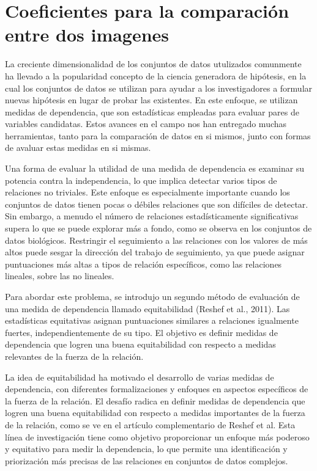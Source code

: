 \chapter{Coeficientes para la
comparaci\'on entre dos
imagenes}\label{chap3}

La creciente dimensionalidad de los conjuntos de datos utulizados comunmente ha llevado a la popularidad concepto de la ciencia generadora de hip\'otesis, en la cual los conjuntos de datos se utilizan para ayudar a los investigadores a formular nuevas hip\'otesis en lugar de probar las existentes. En este enfoque, se utilizan medidas de dependencia, que son estad\'isticas empleadas para evaluar pares de variables candidatas. Estos avances en el campo nos han entregado muchas herramientas, tanto para la comparaci\'on de datos en si mismos, junto con formas de avaluar estas medidas en si mismas. 

Una forma de evaluar la utilidad de una medida de dependencia es examinar su potencia contra la independencia, lo que implica detectar varios tipos de relaciones no triviales. Este enfoque es especialmente importante cuando los conjuntos de datos tienen pocas o d\'ebiles relaciones que son dif\'iciles de detectar. Sin embargo, a menudo el n\'umero de relaciones estad\'isticamente significativas supera lo que se puede explorar m\'as a fondo, como se observa en los conjuntos de datos biol\'ogicos. Restringir el seguimiento a las relaciones con los valores de m\'as altos puede sesgar la direcci\'on del trabajo de seguimiento, ya que puede asignar puntuaciones m\'as altas a tipos de relaci\'on espec\'ificos, como las relaciones lineales, sobre las no lineales.

Para abordar este problema, se introdujo un segundo m\'etodo de evaluaci\'on de una medida de dependencia llamado equitabilidad (Reshef et al., 2011). Las estad\'isticas equitativas asignan puntuaciones similares a relaciones igualmente fuertes, independientemente de su tipo. El objetivo es definir medidas de dependencia que logren una buena equitabilidad con respecto a medidas relevantes de la fuerza de la relaci\'on.

La idea de equitabilidad ha motivado el desarrollo de varias medidas de dependencia, con diferentes formalizaciones y enfoques en aspectos espec\'ificos de la fuerza de la relaci\'on. El desaf\'io radica en definir medidas de dependencia que logren una buena equitabilidad con respecto a medidas importantes de la fuerza de la relaci\'on, como se ve en el art\'iculo complementario de Reshef et al. Esta l\'inea de investigaci\'on tiene como objetivo proporcionar un enfoque m\'as poderoso y equitativo para medir la dependencia, lo que permite una identificaci\'on y priorizaci\'on m\'as precisas de las relaciones en conjuntos de datos complejos.

